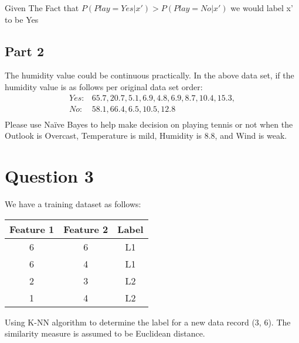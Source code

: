 \documentclass{report}
\begin{document}
Given The Fact that $P(Play=Yes|x') > P(Play=No|x')$ we would label x' to be Yes

\section{Part 2}

	The	humidity	value	could	be	continuous	practically.	In	the	above	data	set,	if
the	humidity	value	is	as	follows per	original	data	set	order:
\begin{equation*}
  \begin{split}
    Yes: & 65.7,	20.7,	5.1,	6.9,	4.8,	6.9,	8.7,	10.4,	15.3, \\
    No:	& 58.1,	66.4,	6.5,	10.5,	12.8 \\
  \end{split}
\end{equation*}
Please	use	Naïve	Bayes	to	help	make	decision	on	playing	tennis	or	not	when	the
Outlook	is	Overcast,	Temperature	is	mild,	Humidity	is	8.8,	and	Wind	is	weak.

\chapter{Question 3}

We  have  a training  dataset as  follows:

\vspace*{0.5 cm}

\begin{tabular}{ |c|c|c| }
  \hline
  Feature 1 & Feature 2 & Label \\
  \hline
  6         & 6         & L1    \\
  \hline
  6         & 4         & L1    \\
  \hline
  2         & 3         & L2    \\
  \hline
  1         & 4         & L2    \\
  \hline
\end{tabular}

\vspace*{0.5 cm}

Using K-NN  algorithm to  determine the label for a new data  record  (3, 6). The 
similarity  measure is  assumed to  be  Euclidean distance.

\vspace*{0.5 cm}

\end{document}
